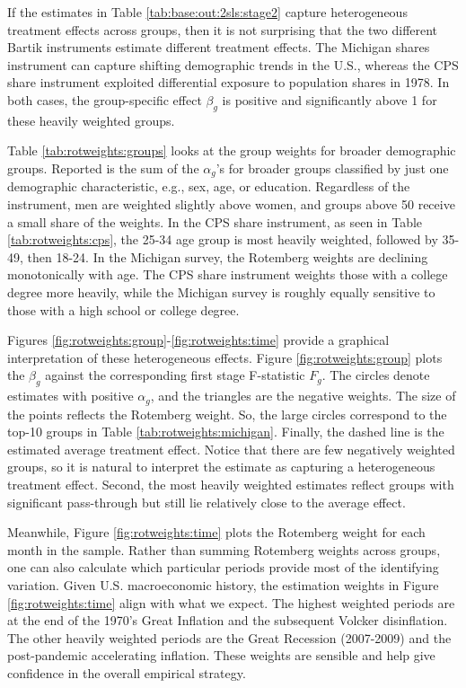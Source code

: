 \documentclass[12pt]{article}
\begin{document}
If the estimates in Table \ref{tab:base:out:2sls:stage2} capture heterogeneous treatment effects across groups, then it is not surprising that the two different Bartik instruments estimate different treatment effects. The Michigan shares instrument can capture shifting demographic trends in the U.S., whereas the CPS share instrument exploited differential exposure to population shares in 1978. In both cases, the group-specific effect $\beta_g$ is positive and significantly above 1 for these heavily weighted groups.  

Table \ref{tab:rotweights:groups} looks at the group weights for broader demographic groups. Reported is the sum of the $\alpha_g$'s for broader groups classified by just one demographic characteristic, e.g., sex, age, or education. Regardless of the instrument, men are weighted slightly above women, and groups above 50 receive a small share of the weights. In the CPS share instrument, as seen in Table \ref{tab:rotweights:cps}, the 25-34 age group is most heavily weighted, followed by 35-49, then 18-24. In the Michigan survey, the Rotemberg weights are declining monotonically with age. The CPS share instrument weights those with a college degree more heavily, while the Michigan survey is roughly equally sensitive to those with a high school or college degree.

Figures \ref{fig:rotweights:group}-\ref{fig:rotweights:time} provide a graphical interpretation of these heterogeneous effects. Figure \ref{fig:rotweights:group} plots the $\beta_g$ against the corresponding first stage F-statistic $F_g$. The circles denote estimates with positive $\alpha_g$, and the triangles are the negative weights. The size of the points reflects the Rotemberg weight. So, the large circles correspond to the top-10 groups in Table \ref{tab:rotweights:michigan}. Finally, the dashed line is the estimated average treatment effect. Notice that there are few negatively weighted groups, so it is natural to interpret the estimate as capturing a heterogeneous treatment effect. Second, the most heavily weighted estimates reflect groups with significant pass-through but still lie relatively close to the average effect.  

Meanwhile, Figure \ref{fig:rotweights:time} plots the Rotemberg weight for each month in the sample. Rather than summing Rotemberg weights across groups, one can also calculate which particular periods provide most of the identifying variation. Given U.S. macroeconomic history, the estimation weights in Figure \ref{fig:rotweights:time} align with what we expect. The highest weighted periods are at the end of the 1970's Great Inflation and the subsequent Volcker disinflation. The other heavily weighted periods are the Great Recession (2007-2009) and the post-pandemic accelerating inflation. These weights are sensible and help give confidence in the overall empirical strategy.
\end{document}
